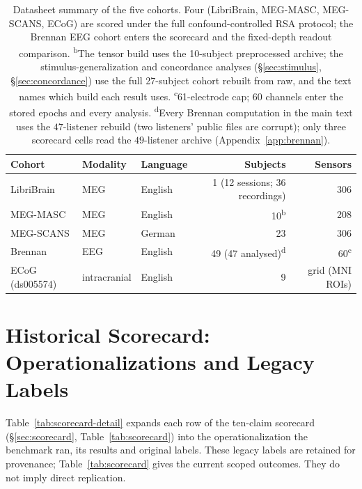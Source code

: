 \documentclass{article}
\begin{document}
\begin{table}[t]
\centering
\small
\begin{tabular}{lllrr}
\toprule
Cohort & Modality & Language & Subjects & Sensors \\
\midrule
LibriBrain & MEG & English & 1 (12 sessions; 36 recordings) & 306 \\
MEG-MASC & MEG & English & 10\textsuperscript{b} & 208 \\
MEG-SCANS & MEG & German & 23 & 306 \\
Brennan & EEG & English & 49 (47 analysed)\textsuperscript{d} & 60\textsuperscript{c} \\
ECoG (ds005574) & intracranial & English & 9 & grid (MNI ROIs) \\
\bottomrule
\end{tabular}
\caption{Datasheet summary of the five cohorts. Four (LibriBrain, MEG-MASC,
MEG-SCANS, ECoG) are scored under the full confound-controlled RSA protocol; the
Brennan EEG cohort enters the scorecard and the fixed-depth readout comparison.
\textsuperscript{b}The tensor build uses the 10-subject preprocessed archive; the
stimulus-generalization and concordance analyses (\S\ref{sec:stimulus}, \S\ref{sec:concordance})
use the full 27-subject cohort rebuilt from raw, and the text names which build each result uses.
\textsuperscript{c}61-electrode cap; 60 channels enter the stored epochs and every analysis.
\textsuperscript{d}Every Brennan computation in the main text uses the $47$-listener rebuild (two
listeners' public files are corrupt); only three scorecard cells read the $49$-listener archive
(Appendix~\ref{app:brennan}).}
\label{tab:datasheet}
\end{table}


\section*{Historical Scorecard: Operationalizations and Legacy Labels}\label{app:scorecard-detail}

Table~\ref{tab:scorecard-detail} expands each row of the ten-claim scorecard
(\S\ref{sec:scorecard}, Table~\ref{tab:scorecard}) into the operationalization the
benchmark ran, its results and original labels. These legacy labels are retained for provenance;
Table~\ref{tab:scorecard} gives the current scoped outcomes. They do not imply direct replication.
\end{document}
